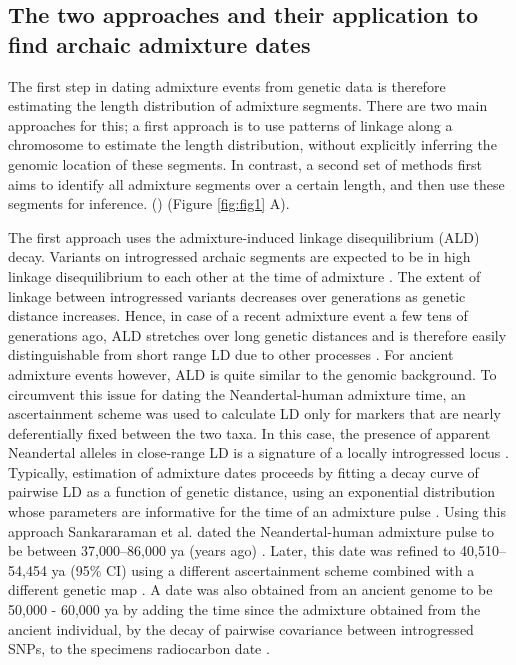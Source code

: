 \documentclass[]{article}
\begin{document}
\subsection{The two approaches and their application to find archaic admixture dates}\label{the-two-approaches-and-their-application-to-find-archaic-admixture-dates}

The first step in dating admixture events from genetic data is therefore estimating the length distribution of admixture segments.  There are two main approaches for this; a first approach is to use patterns of linkage along a chromosome to estimate the length distribution, without explicitly inferring the genomic location of these segments. In contrast, a second set of methods first aims to identify all admixture segments over a certain length, and then use these segments for inference. 
(\citep{chimusa_dating_2018}) (Figure \ref{fig:fig1} A).

The first approach uses the admixture-induced linkage disequilibrium
(ALD) decay. Variants on introgressed archaic segments are
expected to be in high linkage disequilibrium to each other at the time
of admixture
\citep{chakraborty_admixture_1988,stephens_mapping_1994,wall_detecting_2000}. The extent of linkage between introgressed variants decreases over generations as genetic distance increases. Hence, in case of a recent
admixture event a few tens of generations ago, ALD stretches  over long genetic distances
\citep{patterson_methods_2004} and is therefore easily distinguishable
from short range LD due to other processes \citep{moorjani_history_2011}. For ancient
admixture events however, ALD is quite similar to the genomic background. To circumvent this issue for dating the Neandertal-human admixture time, an ascertainment scheme was used to calculate LD only for markers that are nearly deferentially fixed between the two taxa. In this case, the presence of apparent Neandertal alleles in close-range LD is a signature of a locally introgressed locus
\citep{sankararaman_date_2012}. Typically, estimation of admixture dates proceeds by fitting a decay curve of pairwise LD as a function of
genetic distance, using an exponential distribution whose parameters are informative for the time of an admixture pulse
\citep{moorjani_history_2011,loh_inferring_2013}. Using this approach Sankararaman et al. dated the Neandertal-human admixture pulse to
be  between 37,000--86,000 ya (years ago) \citep{sankararaman_date_2012}. Later,
this date was refined to 40,510--54,454 ya (95\% CI) using a different
ascertainment scheme combined with a different genetic map
\citep{moorjani_genetic_2016}. A date was also obtained from an ancient
genome to be 50,000 - 60,000 ya by adding the time since the admixture obtained from the
ancient individual, by the decay of pairwise covariance between
introgressed SNPs, to the specimens radiocarbon date
\citep{fu_genome_2014}.
\end{document}
